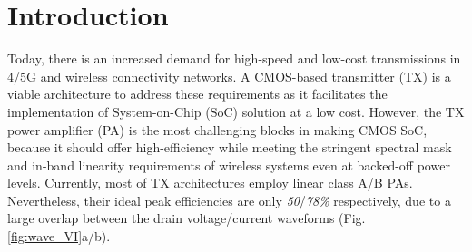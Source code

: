 \documentclass[conference]{IEEEtran}
\begin{document}
\section{Introduction}
Today, there is an increased demand for high-speed and low-cost transmissions in 4/5G and wireless connectivity networks. A CMOS-based transmitter (TX) is a viable architecture to address these requirements as it facilitates the implementation of System-on-Chip (SoC) solution at a low cost. However, the TX power amplifier (PA) is the most challenging blocks in making CMOS SoC, because it should offer high-efficiency while meeting the stringent spectral mask  and in-band linearity requirements of wireless systems even at backed-off power levels. Currently, most of TX architectures employ linear class A/B PAs. Nevertheless, their ideal  peak efficiencies are only \textit{50}/\textit{78\%} respectively, due to a large overlap between the drain voltage/current  waveforms (Fig.\ref{fig:wave_VI}a/b).
\end{document}
